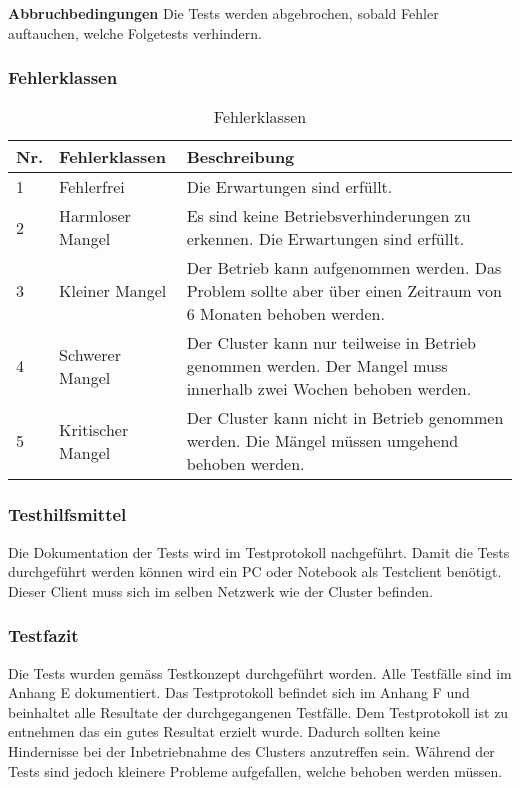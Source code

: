 \textbf{Abbruchbedingungen}\newline
Die Tests werden abgebrochen, sobald Fehler auftauchen, welche Folgetests verhindern.

\subsubsection{Fehlerklassen}
\begin{table}[H]
\centering
\begin{tabular}{p{1cm}p{4cm}p{11cm}}
\hline
\rowcolor{heading} \textbf{Nr.} & \textbf{Fehlerklassen} & \textbf{Beschreibung} \\\hline
1 & Fehlerfrei & Die Erwartungen sind erfüllt.  \\\hline
2 & Harmloser Mangel & Es sind keine Betriebsverhinderungen zu erkennen. Die Erwartungen sind erfüllt. \\\hline
3 & Kleiner Mangel & Der Betrieb kann aufgenommen werden. Das Problem sollte aber über einen Zeitraum von 6 Monaten behoben werden.  \\\hline
4 & Schwerer Mangel & Der Cluster kann nur teilweise in Betrieb genommen werden. Der Mangel muss innerhalb zwei Wochen behoben werden. \\\hline
5 & Kritischer Mangel & Der Cluster kann nicht in Betrieb genommen werden. Die Mängel müssen umgehend behoben werden. \\\hline
\end{tabular}
\caption{Fehlerklassen}
\end{table}

\subsubsection{Testhilfsmittel}
Die Dokumentation der Tests wird im Testprotokoll nachgeführt. Damit die Tests durchgeführt werden können wird ein PC oder Notebook als Testclient benötigt. Dieser Client muss sich im selben Netzwerk wie der Cluster befinden.


\subsubsection{Testfazit}
Die Tests wurden gemäss Testkonzept durchgeführt worden. Alle Testfälle sind im Anhang E dokumentiert. Das Testprotokoll befindet sich im Anhang F und beinhaltet alle Resultate der durchgegangenen Testfälle. Dem Testprotokoll ist zu entnehmen das ein gutes Resultat erzielt wurde. Dadurch sollten keine Hindernisse bei der Inbetriebnahme des Clusters anzutreffen sein. Während der Tests sind jedoch kleinere Probleme aufgefallen, welche behoben werden müssen.\newline

